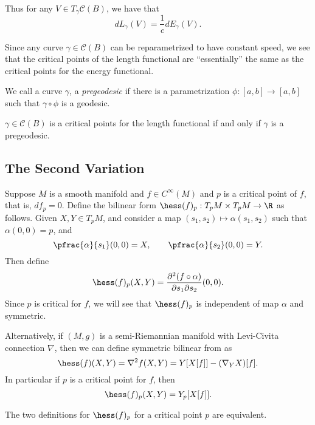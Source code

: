 Thus for any $V\in T_\gamma\mathcal{C}(B)$, we have that
$$dL_\gamma(V)=\frac{1}{c}dE_\gamma(V).$$

Since any curve $\gamma\in\mathcal{C}(B)$ can be reparametrized to have constant speed, we see that the critical points of the length functional are ``essentially'' the same as the critical points for the energy functional.

We call a curve $\gamma$, a \textit{pregeodesic} if there is a parametrization $\phi:[a,b]\to[a,b]$ such that $\gamma\circ\phi$ is a geodesic.

\begin{cor}
    $\gamma\in\mathcal{C}(B)$ is a critical points for the length functional if and only if $\gamma$ is a pregeodesic.
\end{cor}



\subsection{The Second Variation}

Suppose $M$ is a smooth manifold and $f\in C^\infty(M)$ and $p$ is a critical point of $f$, that is, $df_p=0$.  Define the bilinear form $\hess(f)_p:T_pM\times T_pM\to\R$ as follows.  Given $X,Y\in T_pM$, and consider a map $(s_1,s_2)\mapsto \alpha(s_1,s_2)$ such that $\alpha(0,0)=p$, and
$$\pfrac{\alpha}{s_1}(0,0)=X,\qquad\pfrac{\alpha}{s_2}(0,0)=Y.$$
Then define
$$\hess(f)_p(X,Y)=\frac{\partial^2(f\circ\alpha)}{\partial s_1\partial s_2}(0,0).$$
Since $p$ is critical for $f$, we will see that $\hess(f)_p$ is independent of map $\alpha$ and symmetric.

Alternatively, if $(M,g)$ is a semi-Riemannian manifold with Levi-Civita connection $\nabla$, then we can define symmetric bilinear from as
$$\hess(f)(X,Y)=\nabla^2f(X,Y)=Y[X[f]]-(\nabla_YX)[f].$$
In particular if $p$ is a critical point for $f$, then 
$$\hess(f)_p(X,Y)=Y_p[X[f]].$$

\begin{lem}
    The two definitions for $\hess(f)_p$ for a critical point $p$ are equivalent.
\end{lem}

